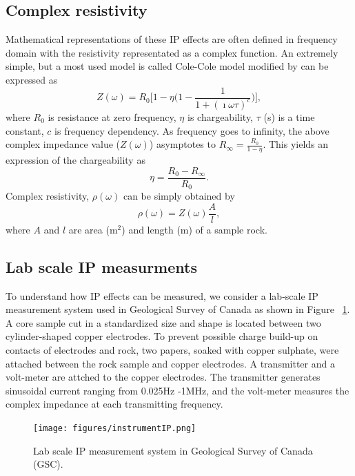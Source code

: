 \documentclass[letterpaper,11pt]{article}
\begin{document}

\subsection{Complex resistivity}

Mathematical representations of these IP effects are often defined in frequency domain with the resistivity representated as a complex function.
An extremely simple, but a most used model is called Cole-Cole model modified by \cite{Pelton1978} can be expressed as 
\begin{equation}
  Z(\omega) = R_0 \Big[1 - \eta \Big(1-\frac{1}{1+(\imath\omega\tau)^c}\Big) \Big],
  \label{eq:colecole}
\end{equation}
where $R_0$ is resistance at zero frequency, $\eta$ is chargeability, $\tau$ (s) is a time constant, $c$ is frequency dependency. As frequency goes to infinity, the above complex impedance value ($Z(\omega)$) asymptotes to $R_{\infty} = \frac{R_0}{1-\eta}$. This yields an expression of the chargeability as 
\begin{equation}
  \eta = \frac{R_0-R_{\infty}}{R_0}.
\end{equation}
Complex resistivity, $\rho(\omega)$ can be simply obtained by 
\begin{equation}
  \rho(\omega) = Z(\omega)\frac{A}{l},
\end{equation}
where $A$ and $l$ are area (m$^2$) and length (m) of a sample rock. 


\subsection{Lab scale IP measurments}
To understand how IP effects can be measured, we consider a lab-scale IP measurement system used in Geological Survey of Canada \cite[]{Enkin2012} as shown in Figure ~\ref{Fig:instrumentIP}. A core sample cut in a standardized size and shape is located between two cylinder-shaped copper electrodes. To prevent possible charge build-up on contacts of electrodes and rock, two papers, soaked with copper sulphate, were attached between the rock sample and copper electrodes. A transmitter and a volt-meter are attched to the copper electrodes. The transmitter generates sinusoidal current ranging from 0.025Hz -1MHz, and the volt-meter measures the complex impedance at each transmitting frequency. 
\begin{figure}[htb]
  \centering
  \texttt{[image: figures/instrumentIP.png]}
  \caption{Lab scale IP measurement system in Geological Survey of Canada (GSC). }
  \label{Fig:instrumentIP}
\end{figure}
\end{document}
